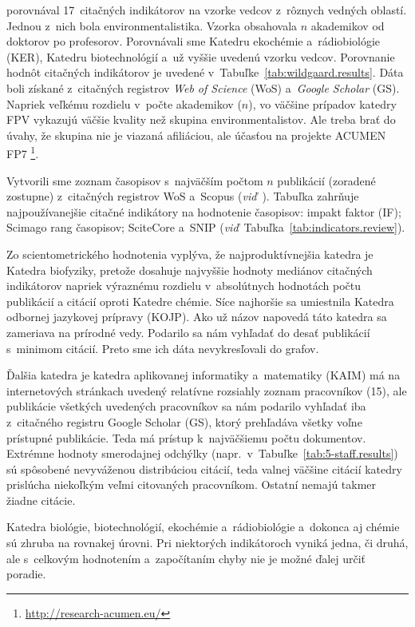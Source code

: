 \citet{Wildgaard2015} porovnával 17~citačných indikátorov na vzorke vedcov
z~rôznych vedných oblastí.  Jednou z~nich bola environmentalistika.  Vzorka
obsahovala $n$ akademikov od doktorov po profesorov.  Porovnávali sme Katedru
ekochémie a~rádiobiológie (KER), Katedru biotechnológií a~už vyššie uvedenú
vzorku vedcov.  Porovnanie hodnôt citačných indikátorov je uvedené
v~Tabuľke~\ref{tab:wildgaard.results}.  Dáta boli získané z~citačných registrov
\emph{Web of Science} (WoS) a~\emph{Google Scholar} (GS).  Napriek veľkému
rozdielu v~počte akademikov ($n$), vo väčšine prípadov katedry FPV vykazujú
väčšie kvality než skupina environmentalistov.  Ale treba brať do úvahy, že
skupina nie je viazaná afiliáciou, ale účasťou na projekte ACUMEN FP7%
\footnote{\url{http://research-acumen.eu/}}.

Vytvorili sme zoznam časopisov s~najväčším počtom $n$ publikácií (zoradené
zostupne) z~citačných registrov WoS a~Scopus
(\emph{viď}~).  Tabuľka zahrňuje najpoužívanejšie citačné
indikátory na hodnotenie časopisov: impakt faktor (IF); Scimago rang časopisov;
SciteCore a~SNIP (\emph{viď}~Tabuľka~\ref{tab:indicators.review}).

Zo scientometrického hodnotenia vyplýva, že najproduktívnejšia katedra je
Katedra biofyziky, pretože dosahuje najvyššie hodnoty mediánov citačných
indikátorov napriek výraznému rozdielu v~absolútnych hodnotách počtu publikácií
a citácií oproti Katedre chémie.  Síce najhoršie sa umiestnila Katedra odbornej
jazykovej prípravy (KOJP).  Ako už názov napovedá táto katedra sa zameriava na
prírodné vedy.  Podarilo sa nám vyhľadať do desať publikácií s~minimom citácií.
Preto sme ich dáta nevykresľovali do grafov.

Ďalšia katedra je katedra aplikovanej informatiky a~matematiky (KAIM) má na
internetových stránkach uvedený relatívne rozsiahly zoznam pracovníkov (15), ale
publikácie všetkých uvedených pracovníkov sa nám podarilo vyhľadať iba
z~citačného registru Google Scholar (GS), ktorý prehľadáva všetky voľne
prístupné publikácie.  Teda má prístup k~najväčšiemu počtu dokumentov.  Extrémne
hodnoty smerodajnej odchýlky (napr.~v~Tabuľke~\ref{tab:5-staff.results}) sú
spôsobené nevyváženou distribúciou citácií, teda valnej väčšine citácií katedry
prislúcha niekoľkým veľmi citovaných pracovníkom.  Ostatní nemajú takmer žiadne
citácie.

Katedra biológie, biotechnológií, ekochémie a~rádiobiológie a~dokonca aj chémie
sú zhruba na rovnakej úrovni.  Pri niektorých indikátoroch vyniká jedna, či
druhá, ale s~celkovým hodnotením a~započítaním chyby nie je možné ďalej určiť
poradie.


